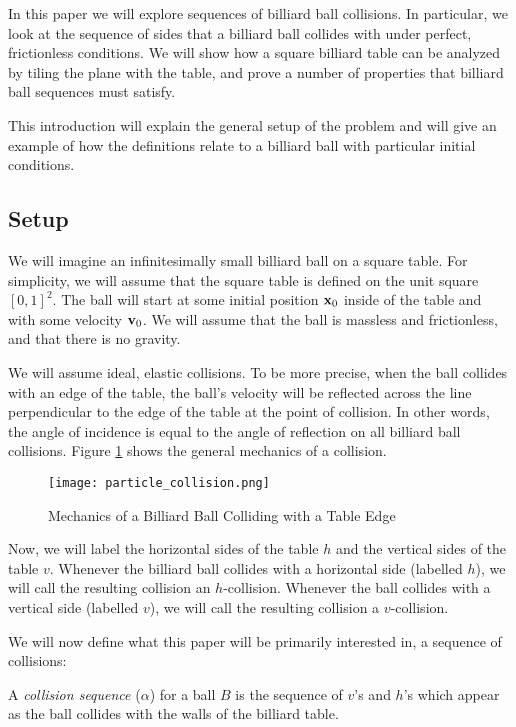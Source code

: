 In this paper we will explore sequences of billiard ball collisions. In particular, we look at the sequence of sides that a billiard ball collides with under perfect, frictionless conditions. We will show how a square billiard table can be analyzed by tiling the plane with the table, and prove a number of properties that billiard ball sequences must satisfy.

This introduction will explain the general setup of the problem and will give an example of how the definitions relate to a billiard ball with particular initial conditions.

\subsection{Setup}

We will imagine an infinitesimally small billiard ball on a square table. For simplicity, we will assume that the square table is defined on the unit square $[0,1]^2$. The ball will start at some initial position $\mathbf{x}_0$ inside of the table and with some velocity $\mathbf{v}_0$. We will assume that the ball is massless and frictionless, and that there is no gravity.

We will assume ideal, elastic collisions. To be more precise, when the ball collides with an edge of the table, the ball's velocity will be reflected across the line perpendicular to the edge of the table at the point of collision. In other words, the angle of incidence is equal to the angle of reflection on all billiard ball collisions. Figure \ref{fig:collision-angle} shows the general mechanics of a collision.

\begin{figure}
  \texttt{[image: particle\_collision.png]}
  \caption{\label{fig:collision-angle}Mechanics of a Billiard Ball Colliding with a Table Edge}
\end{figure}

Now, we will label the horizontal sides of the table $h$ and the vertical sides of the table $v$. Whenever the billiard ball collides with a horizontal side (labelled $h$), we will call the resulting collision an $h$-collision. Whenever the ball collides with a vertical side (labelled $v$), we will call the resulting collision a $v$-collision.

We will now define what this paper will be primarily interested in, a sequence of collisions:

\begin{definition}
  A \emph{collision sequence} ($\alpha$) for a ball $B$ is the sequence of $v$'s and $h$'s which appear as the ball collides with the walls of the billiard table.
\end{definition}

